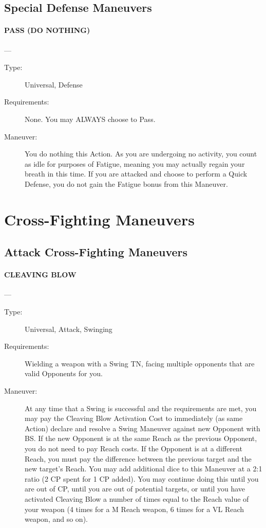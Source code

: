\documentclass[oneside,11pt,english]{book}
\begin{document}
\subsection{Special Defense Maneuvers}
\paragraph{\large\label{man:PASS (DO NOTHING)} PASS (DO NOTHING)}---\quad{\large[None]}
\vspace{-10pt}\begin{description} 
\item [Type:] Universal, Defense 
\item [Requirements:] None. You may ALWAYS choose to Pass. 
\item [Maneuver:] You do nothing this Action. As you are undergoing no activity, you count as idle for purposes 
of Fatigue, meaning you may actually regain your breath in this time. 
If you are attacked and choose to perform a Quick Defense, you do not gain the Fatigue bonus from this 
Maneuver. 
\end{description}
\section{Cross-Fighting Maneuvers}
\subsection{Attack Cross-Fighting Maneuvers}
\paragraph{\large\label{man:CLEAVING BLOW} CLEAVING BLOW}---\quad{\large[2]}
\vspace{-10pt}\begin{description} 
\item [Type:] Universal, Attack, Swinging 
\item [Requirements:] Wielding a weapon with a Swing TN, facing multiple opponents that are valid Opponents 
for you. 
\item [Maneuver:] At any time that a Swing is successful and the requirements are met, you may pay the 
Cleaving Blow Activation Cost to immediately (as same Action) declare and resolve a Swing Maneuver 
against new Opponent with BS. If the new Opponent is at the same Reach as the previous Opponent, you 
do not need to pay Reach costs. If the Opponent is at a different Reach, you must pay the difference 
between the previous target and the new target’s Reach. 
You may add additional dice to this Maneuver at a 2:1 ratio (2 CP spent for 1 CP added). You may 
continue doing this until you are out of CP, until you are out of potential targets, or until you have 
activated Cleaving Blow a number of times equal to the Reach value of your weapon (4 times for a M 
Reach weapon, 6 times for a VL Reach weapon, and so on). 
\end{description}
 
\end{document}
